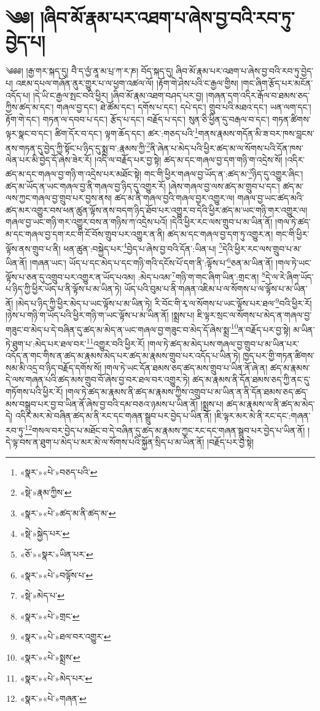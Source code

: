 \chapter{༄༅། །ཞིབ་མོ་རྣམ་པར་འཐག་པ་ཞེས་བྱ་བའི་རབ་ཏུ་བྱེད་པ།}༄༅༅། །རྒྱ་གར་སྐད་དུ། བཻ་ད་ལྱཾ་ནཱ་མ་པྲ་ཀ་ར་ཎ། བོད་སྐད་དུ། ཞིབ་མོ་རྣམ་པར་འཐག་པ་ཞེས་བྱ་བའི་རབ་ཏུ་བྱེད་པ། འཇམ་དཔལ་གཞོན་ནུར་གྱུར་པ་ལ་ཕྱག་འཚལ་ལོ། །རྟོག་གེ་ཤེས་པའི་ང་རྒྱལ་གྱིས། །གང་ཞིག་རྩོད་པར་མངོན་འདོད་པ། །དེ་ཡི་ང་རྒྱལ་སྤང་བའི་ཕྱིར། །ཞིབ་མོ་རྣམ་འཐག་བཤད་པར་བྱ། །གཞན་དག་འདིར་རྒོལ་བ་ཐམས་ཅད་ཀྱིས་ཚད་མ་དང་། གཞལ་བྱ་དང་། ཐེ་ཚོམ་དང་། དགོས་པ་དང་། དཔེ་དང་། གྲུབ་པའི་མཐའ་དང་། ཡན་ལག་དང་། རྟོག་གེ་དང་། གཏན་ལ་དབབ་པ་དང་། རྩོད་པ་དང་། བརྗོད་པ་དང་། སུན་ཅི་ཕྱིན་དུ་བརྒལ་བ་དང་། གཏན་ཚིགས་ལྟར་སྣང་བ་དང་། ཚིག་དོར་བ་དང་། ལྟག་ཆོད་དང་། ཚར་:གཅད་པའི་\footnote{«སྣར་»«པེ་»བཅད་པའི་}གནས་རྣམས་གདོན་མི་ཟ་བར་ཁས་བླངས་ནས་གཏན་དུ་བྱེད་ཀྱི་སྟོང་པ་ཉིད་དུ་སྨྲ་བ་:རྣམས་ཀྱི་\footnote{«སྡེ་»རྣམ་ཀྱིས་}ནི་ཞེན་པ་མེད་པའི་ཕྱིར་ཚད་མ་ལ་སོགས་པའི་དོན་ཁས་ལེན་པར་མི་བྱེད་དོ་ཞེས་ཟེར་རོ། །འདི་ལ་བརྗོད་པར་བྱ་སྟེ། ཚད་མ་དང་གཞལ་བྱ་དག་གཉི་ག་འདྲེས་སོ། །འདིར་ཚད་མ་དང་གཞལ་བྱ་གཉི་ག་འདྲེས་པར་མཐོང་སྟེ། གང་གི་ཕྱིར་གཞལ་བྱ་ཡོད་ན་:ཚད་མ་\footnote{«སྣར་»«པེ་»ཚད་མ་ནི་ཚད་མ་}ཉིད་དུ་འགྱུར་ཞིང་། ཚད་མ་ཡོད་ན་ཡང་གཞལ་བྱ་ནི་གཞལ་བྱ་ཉིད་དུ་འགྱུར་རོ། །ཞེས་གཞལ་བྱ་ལས་ཚད་མ་གྲུབ་པ་དང་། ཚད་མ་ལས་ཀྱང་གཞལ་བྱ་གྲུབ་པར་བྱས་ནས། ཚད་མ་ནི་གཞལ་བྱའི་གཞལ་བྱར་འགྱུར་ལ། གཞལ་བྱ་ཡང་ཚད་མའི་ཚད་མར་འགྱུར་བས་ཕན་ཚུན་ལྟོས་ནས་བདག་ཉིད་ཐོབ་པར་འགྱུར་བ་དེའི་ཕྱིར་ཚད་མ་ཡང་གཉི་གར་འགྱུར་ལ། གཞལ་བྱ་ཡང་གཉི་གར་འགྱུར་བས་ན་གཉིས་ཀ་འདྲེས་པའོ། །དེའི་ཕྱིར་རང་ལས་གྲུབ་པ་མ་ཡིན་ནོ། །གལ་ཏེ་ཚད་མ་དང་གཞལ་བྱ་དག་རང་གི་ངོ་བོས་གྲུབ་པར་འགྱུར་ན་ནི། ཚད་མ་དང་གཞལ་བྱ་དག་ཏུ་འགྱུར་ན། གང་གི་ཕྱིར་ལྟོས་ནས་གྲུབ་པ་ནི། ཕན་ཚུན་:བསྐྱེད་པར་\footnote{«སྡེ་»སྐྱེད་པར་}བྱེད་པ་ཞེས་བྱ་བའི་དོན་:ཡིན་པ། \footnote{«ཅོ་»«སྣར་»ཡིན་པར་}དེའི་ཕྱིར་རང་ལས་གྲུབ་པ་མ་ཡིན་ནོ། །གཞན་ཡང་། ཡོད་པ་དང་མེད་པ་དང་གཉི་གའི་དངོས་པོ་དག་ནི་:ལྟོས་པ་\footnote{«སྣར་»«པེ་»བལྟོས་པ་}ཅན་མ་ཡིན་ནོ། །གལ་ཏེ་ཡང་ལྟོས་པ་ཅན་དུ་འགྲུབ་པར་འགྱུར་ན་ཡོད་པའམ། :མེད་པའམ་\footnote{«སྡེ་»མེད་པ་}གཉི་ག་གང་ཞིག་ཡིན་:གྲང་ན། \footnote{«སྣར་»«པེ་»གྲང་}དེ་ལ་རེ་ཞིག་ཡོད་པ་ཉིད་ཀྱི་ཕྱིར་ཡོད་པ་ནི་ལྟོས་པ་མ་ཡིན་ཏེ། ཡོད་པའི་བུམ་པ་ནི་གཞན་འཇིམ་པ་ལ་སོགས་པ་ལ་ལྟོས་པ་མ་ཡིན་ནོ། །མེད་པ་ཉིད་ཀྱི་ཕྱིར་མེད་པ་ཡང་ལྟོས་པ་མ་ཡིན་ཏེ། རི་བོང་གི་རྭ་ལ་སོགས་པ་ཡང་ལྟོས་པར་ཐལ་\footnote{«སྣར་»«པེ་»ཐལ་བར་འགྱུར་}བའི་ཕྱིར་རོ། །ཉེས་པ་གཉི་ག་ཡོད་པའི་ཕྱིར་གཉི་ག་ཡང་ལྟོས་པ་མ་ཡིན་ནོ། །སྨྲས་པ། ཇི་ལྟར་སྲང་ལ་སོགས་པ་མེད་ན་གཞལ་བྱ་གཟུང་བ་མེད་པ་དེ་བཞིན་དུ་ཚད་མ་མེད་ན་ཡང་གཞལ་བྱ་གཟུང་བ་མེད་དོ་ཞེས་སྨྲ་\footnote{«སྣར་»«པེ་»སྨྲས་}ན་བརྗོད་པར་བྱ་སྟེ། མ་ཡིན་ཏེ་ཐུག་པ་:མེད་པར་ཐལ་བར་\footnote{«སྣར་»«པེ་»མེད་པར་}འགྱུར་བའི་ཕྱིར་རོ། །གལ་ཏེ་ཚད་མ་མེད་པས་གཞལ་བྱ་གྲུབ་པ་མ་ཡིན་པར་འདོད་ན་གང་གིས་ན་ཚད་མ་རྣམས་མེད་པར་ཚད་མ་རྣམས་གྲུབ་པར་འདོད་པ་ཡིན་ཏེ། ཁྱད་པར་གྱི་གཏན་ཚིགས་སམ་མི་འདྲ་བ་ཉིད་བརྗོད་དགོས་སོ། །གལ་ཏེ་ཡང་དོན་ཐམས་ཅད་ཚད་མས་གྲུབ་པ་ཡིན་ནོ་ཞེ་ན། ཚད་མ་རྣམས་དེ་ལས་གཞན་པའི་ཚད་མས་གྲུབ་བོ་ཞེས་བྱ་བར་ཐལ་བར་འགྱུར་ཏེ། ཚད་མ་རྣམས་ནི་དོན་ཐམས་ཅད་ཀྱི་ནང་དུ་གཏོགས་པའི་ཕྱིར་རོ། །གལ་ཏེ་ཚད་མ་རྣམས་ནི་ཚད་མ་རྣམས་ཀྱིས་འགྲུབ་པ་མ་ཡིན་ན་ནི་དོན་ཐམས་ཅད་ཚད་མས་བསྒྲུབ་པར་བྱ་བ་ཡིན་ནོ་ཞེས་བྱ་བའི་དམ་བཅའ་ཉམས་པ་ཡིན་ནོ། །སྨྲས་པ། ཚད་མ་རྣམས་ལ་ནི་ཚད་མ་མེད་དེ། འདིར་མར་མེ་བཞིན་ཚད་མ་ནི་རང་དང་གཞན་སྒྲུབ་པར་བྱེད་པ་ཡིན་ནོ། །ཇི་ལྟར་མར་མེ་ནི་རང་དང་:གཞན་རབ་ཏུ་\footnote{«སྣར་»«པེ་»གཞན་}གསལ་བར་བྱེད་པ་མཐོང་བ་དེ་བཞིན་དུ་ཚད་མ་རྣམས་ཀྱང་རང་དང་གཞན་སྒྲུབ་པར་བྱེད་པ་ཡིན་ནོ། །དེ་ལྟ་བས་ན་ཐུག་པ་མེད་པ་མར་མེ་ལ་སོགས་པའི་སྐྱོན་སྲིད་པ་མ་ཡིན་ནོ། །བརྗོད་པར་བྱ་སྟེ། 